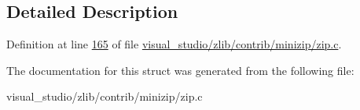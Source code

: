 \subsection{Detailed Description}


Definition at line \hyperlink{visual__studio_2zlib_2contrib_2minizip_2zip_8c_source_l00165}{165} of file \hyperlink{visual__studio_2zlib_2contrib_2minizip_2zip_8c_source}{visual\+\_\+studio/zlib/contrib/minizip/zip.\+c}.



The documentation for this struct was generated from the following file\+:\begin{DoxyCompactItemize}
\item 
visual\+\_\+studio/zlib/contrib/minizip/zip.\+c\end{DoxyCompactItemize}
